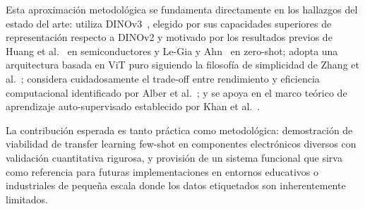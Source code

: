 Esta aproximación metodológica se fundamenta directamente en los hallazgos del estado del arte: utiliza DINOv3~\cite{simeoni2025dinov3}, elegido por sus capacidades superiores de representación respecto a DINOv2 y motivado por los resultados previos de Huang et al.~\cite{huang2025semiconductor} en semiconductores y Le-Gia y Ahn~\cite{legia2025consistent} en zero-shot; adopta una arquitectura basada en ViT puro siguiendo la filosofía de simplicidad de Zhang et al.~\cite{zhang2025exploring}; considera cuidadosamente el trade-off entre rendimiento y eficiencia computacional identificado por Alber et al.~\cite{alber2024evaluating}; y se apoya en el marco teórico de aprendizaje auto-supervisado establecido por Khan et al.~\cite{khan2024survey}.

La contribución esperada es tanto práctica como metodológica: demostración de viabilidad de transfer learning few-shot en componentes electrónicos diversos con validación cuantitativa rigurosa, y provisión de un sistema funcional que sirva como referencia para futuras implementaciones en entornos educativos o industriales de pequeña escala donde los datos etiquetados son inherentemente limitados.
